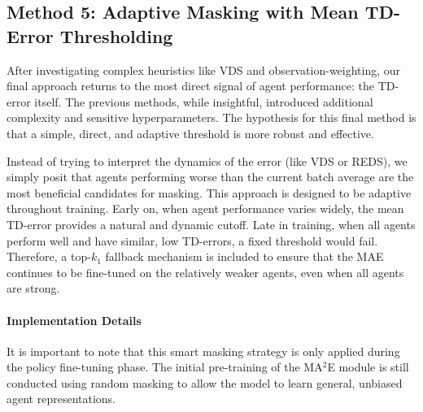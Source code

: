 \subsection{Method 5: Adaptive Masking with Mean TD-Error Thresholding}

After investigating complex heuristics like VDS and observation-weighting, our final approach returns to the most direct signal of agent performance: the TD-error itself. The previous methods, while insightful, introduced additional complexity and sensitive hyperparameters. The hypothesis for this final method is that a simple, direct, and adaptive threshold is more robust and effective.

Instead of trying to interpret the dynamics of the error (like VDS or REDS), we simply posit that agents performing worse than the current batch average are the most beneficial candidates for masking. This approach is designed to be adaptive throughout training. Early on, when agent performance varies widely, the mean TD-error provides a natural and dynamic cutoff. Late in training, when all agents perform well and have similar, low TD-errors, a fixed threshold would fail. Therefore, a top-$k_1$ fallback mechanism is included to ensure that the MAE continues to be fine-tuned on the relatively weaker agents, even when all agents are strong.

\paragraph{Implementation Details}
It is important to note that this smart masking strategy is only applied during the policy fine-tuning phase. The initial pre-training of the MA$^2$E module is still conducted using random masking to allow the model to learn general, unbiased agent representations.

